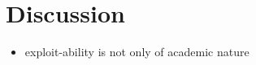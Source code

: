 \section{Discussion}
\label{sec:discussion}

\begin{itemize}
    \item exploit-ability is not only of academic nature
\end{itemize}
